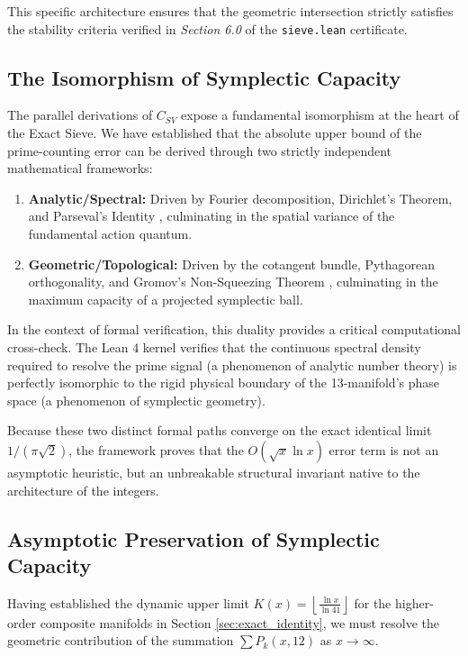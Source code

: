 \documentclass[sn-mathphys-num, pdflatex, referee]{sn-jnl}
\begin{document}
This specific architecture ensures that the geometric intersection strictly satisfies the stability criteria verified in \textit{Section 6.0} of the \texttt{sieve.lean} certificate.

\subsection{The Isomorphism of Symplectic Capacity}

The parallel derivations of $C_{SV}$ expose a fundamental isomorphism at the heart of the Exact Sieve. We have established that the absolute upper bound of the prime-counting error can be derived through two strictly independent mathematical frameworks:

\begin{enumerate}
    \item \textbf{Analytic/Spectral:} Driven by Fourier decomposition, Dirichlet's Theorem, and Parseval's Identity \cite{stein2003fourier}, culminating in the spatial variance of the fundamental action quantum.
    \item \textbf{Geometric/Topological:} Driven by the cotangent bundle, Pythagorean orthogonality, and Gromov's Non-Squeezing Theorem \cite{mcduff2017introduction}, culminating in the maximum capacity of a projected symplectic ball.
\end{enumerate}

In the context of formal verification, this duality provides a critical computational cross-check. The Lean 4 kernel verifies that the continuous spectral density required to resolve the prime signal (a phenomenon of analytic number theory) is perfectly isomorphic to the rigid physical boundary of the 13-manifold's phase space (a phenomenon of symplectic geometry). 

Because these two distinct formal paths converge on the exact identical limit $1/(\pi\sqrt{2})$, the framework proves that the $O(\sqrt{x}\ln x)$ error term is not an asymptotic heuristic, but an unbreakable structural invariant native to the architecture of the integers.

\subsection{Asymptotic Preservation of Symplectic Capacity}

Having established the dynamic upper limit $K(x) = \left\lfloor \frac{\ln x}{\ln 41} \right\rfloor$ for the higher-order composite manifolds in Section \ref{sec:exact_identity}, we must resolve the geometric contribution of the summation $\sum P_k(x,12)$ as $x \rightarrow \infty$.
\end{document}
